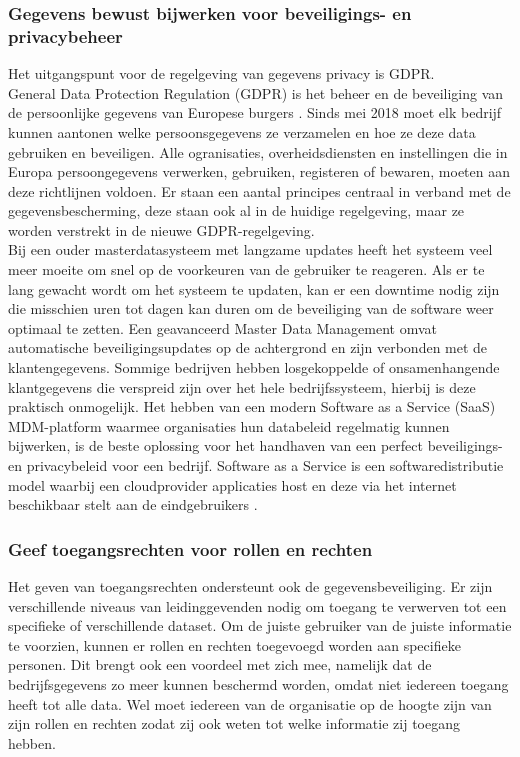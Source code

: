 \subsubsection{Gegevens bewust bijwerken voor beveiligings- en privacybeheer}
Het uitgangspunt voor de regelgeving van gegevens privacy is GDPR.
\\General Data Protection Regulation (GDPR) is het beheer en de beveiliging van de persoonlijke gegevens van Europese burgers \autocite{Vlaanderen}. Sinds mei 2018 moet elk bedrijf kunnen aantonen welke persoonsgegevens ze verzamelen en hoe ze deze data gebruiken en beveiligen. Alle ogranisaties, overheidsdiensten en instellingen die in Europa persoongegevens verwerken, gebruiken, registeren of bewaren, moeten aan deze richtlijnen voldoen. Er staan een aantal principes centraal in verband met de gegevensbescherming, deze staan ook al in de huidige regelgeving, maar ze worden verstrekt in de nieuwe GDPR-regelgeving.
\\Bij een ouder masterdatasysteem met langzame updates heeft het systeem veel meer moeite om snel op de voorkeuren van de gebruiker te reageren. Als er te lang gewacht wordt om het systeem te updaten, kan er een downtime nodig zijn die misschien uren tot dagen kan duren om de beveiliging van de software weer optimaal te zetten. Een geavanceerd Master Data Management omvat automatische beveiligingsupdates op de achtergrond en zijn verbonden met de klantengegevens. Sommige bedrijven hebben losgekoppelde of onsamenhangende klantgegevens die verspreid zijn over het hele bedrijfssysteem, hierbij is deze praktisch onmogelijk. Het hebben van een modern Software as a Service (SaaS) MDM-platform waarmee organisaties hun databeleid regelmatig kunnen bijwerken, is de beste oplossing voor het handhaven van een perfect beveiligings- en privacybeleid voor een bedrijf. Software as a Service is een softwaredistributie model waarbij een cloudprovider applicaties host en deze via het internet beschikbaar stelt aan de eindgebruikers \autocite{Chai2022}.

\subsubsection{Geef toegangsrechten voor rollen en rechten}
Het geven van toegangsrechten ondersteunt ook de gegevensbeveiliging. Er zijn verschillende niveaus van leidinggevenden nodig om toegang te verwerven tot een specifieke of verschillende dataset. Om de juiste gebruiker van de juiste informatie te voorzien, kunnen er rollen en rechten toegevoegd worden aan specifieke personen. Dit brengt ook een voordeel met zich mee, namelijk dat de bedrijfsgegevens zo meer kunnen beschermd worden, omdat niet iedereen toegang heeft tot alle data. Wel moet iedereen van de organisatie op de hoogte zijn van zijn rollen en rechten zodat zij ook weten tot welke informatie zij toegang hebben. 


